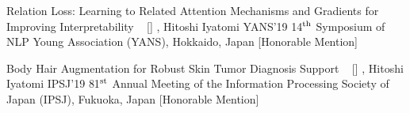 \begin{publications}



    \dcpublication
    {Relation Loss: Learning to Related Attention Mechanisms and Gradients for Improving Interpretability}
    {
    ~ [\href{https://www.hosei.ac.jp/gs/NEWS/zaigaku/koganei/20190920/}{\small{\linkSymbol}}]
    }
    {\underline{}, Hitoshi Iyatomi}
    {YANS'19} {14$^{\textrm{\scriptsize th}}$ Symposium of NLP Young Association (YANS), Hokkaido, Japan [Honorable Mention]}

    \dcpublication
    {Body Hair Augmentation for Robust Skin Tumor Diagnosis Support}
    {
    ~ [\href{https://www.hosei.ac.jp/gs/NEWS/topics/jusho/190411_4/}{\small{\linkSymbol}}]
    }
    {\underline{}, Hitoshi Iyatomi}
    {IPSJ'19} {81$^{\textrm{\scriptsize st}}$ Annual Meeting of the Information Processing Society of Japan (IPSJ), Fukuoka, Japan [Honorable Mention]}

\end{publications}

